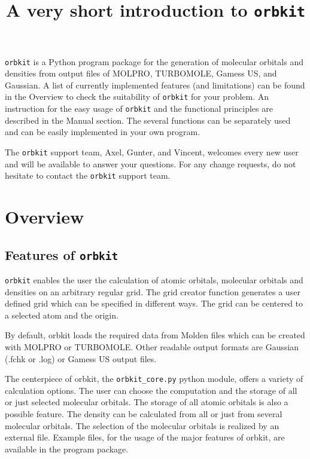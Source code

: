 \documentclass[a4paper,10pt]{scrartcl}
\begin{document}
\title{A very short introduction to \texttt{orbkit}}

\maketitle
\texttt{orbkit} is a Python program package
for the generation of molecular orbitals and densities from output
files of MOLPRO, TURBOMOLE, Gamess US, and Gaussian. A list of currently
implemented features (and limitations) can be found in the Overview
to check the suitability of \texttt{orbkit} for your problem. An instruction
for the easy usage of \texttt{orbkit} and the functional principles are described
in the Manual section. The several functions can be separately used
and can be easily implemented in your own program. 

The \texttt{orbkit} support team, Axel, Gunter, and Vincent, welcomes every new
user and will be available to answer your questions. For any change
requests, do not hesitate to contact the \texttt{orbkit} support team.


\section{Overview}

\subsection{Features of \texttt{orbkit}}

\texttt{orbkit} enables the user the calculation of atomic orbitals, molecular
orbitals and densities on an arbitrary regular grid. The grid creator
function generates a user defined grid which can be specified in different
ways. The grid can be centered to a selected atom and the origin. 

By default, orbkit loads the required data from Molden files which
can be created with MOLPRO or TURBOMOLE. Other readable output formats
are Gaussian (.fchk or .log) or Gamess US output files.

The centerpiece of orbkit, the \verb!orbkit_core.py! python module, offers
a variety of calculation options. The user can choose the computation
and the storage of all or just selected molecular orbitals. The storage
of all atomic orbitals is also a possible feature. The density can
be calculated from all or just from several molecular orbitals. The
selection of the molecular orbitals is realized by an external file.
Example files, for the usage of the major features of orbkit, are
available in the program package. 
\end{document}
